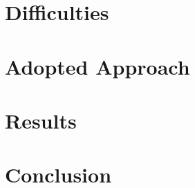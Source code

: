 \documentclass[]{IEEEtran}
\begin{document}
\section{Difficulties}

\section{Adopted Approach}

\section{Results}

\section{Conclusion}



\end{document}

